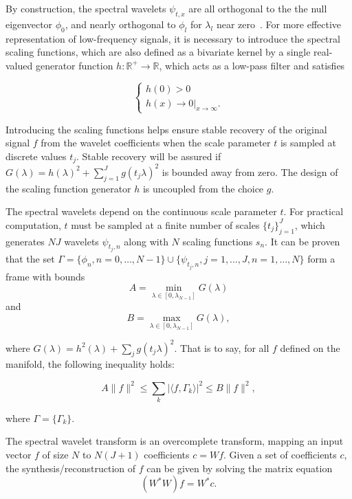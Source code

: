 By construction, the spectral wavelets $\psi_{t,x}$ are all orthogonal to the the null eigenvector $\phi_0$,
and nearly orthogonal to $\phi_l$ for $\lambda_l$ near zero~\cite{Hammond2011}. For more effective representation
of low-frequency signals, it is necessary to introduce the spectral scaling functions, which are also defined 
as a bivariate kernel by a single real-valued generator function $h:\mathbb{R}^+\to\mathbb{R}$,
which acts as a low-pass filter and satisfies

\begin{equation}
  \left\{
  \begin{array}{l}
    h(0)> 0 \\
    h(x)\rightarrow 0|_{x\rightarrow\infty}.
  \end{array}
  \right.
\end{equation}

Introducing the scaling functions helps ensure stable recovery of the original
signal $f$ from the wavelet coefficients when the scale parameter $t$ is sampled at
discrete values ${t_j}$. Stable recovery will be assured if
$G(\lambda)=h(\lambda)^2+\sum_{j=1}^J g(t_j\lambda)^2$ is
bounded away from zero. The design of the scaling function generator $h$ is uncoupled
from the choice $g$.

The spectral wavelets depend on the continuous scale parameter $t$. For practical computation,
$t$ must be sampled at a finite number of scales $\{t_j\}_{j=1}^J$, which generates
$NJ$ wavelets $\psi_{t_j,n}$ along with $N$ scaling functions $s_n$. It can be proven~\cite{Hammond2011}
that the set $\Gamma=\{\phi_n,n=0,\ldots,N-1\}\cup\{\psi_{t_j,n},j=1,\ldots,J,n=1,\ldots,N\}$
form a frame with bounds
\begin{equation*}
A=\min_{\lambda\in[0,\lambda_{N-1}]}G(\lambda)
\end{equation*}
and
\begin{equation*}
B=\max_{\lambda\in[0,\lambda_{N-1}]}G(\lambda),
\end{equation*}

where $G(\lambda)=h^2(\lambda)+\sum_j g(t_j\lambda)^2$. That is to say,
for all $f$ defined on the manifold, the following inequality holds:

\begin{equation}
A\|f\|^2\leq\sum_k|\langle f,\Gamma_k\rangle|^2\leq B\|f\|^2,
\end{equation}

where $\Gamma=\{\Gamma_k\}$.

The spectral wavelet transform is an overcomplete transform, mapping
an input vector $f$ of size $N$ to $N(J+1)$ coefficients $c=Wf$.
Given a set of coefficients $c$, the synthesis/reconstruction of $f$ can be given by solving the matrix equation
\begin{equation}
(W^*W)f=W^*c.
\end{equation}

